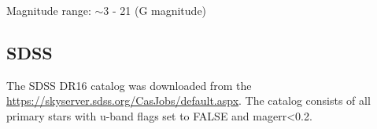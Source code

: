 Magnitude range: $\sim$3 - 21 (G magnitude)

\subsection{SDSS}
\label{sec:sdss}
The SDSS DR16 catalog was downloaded from the \href{SDSS SkyServer}{https://skyserver.sdss.org/CasJobs/default.aspx}.
The catalog consists of all primary stars with u-band flags set to FALSE and magerr<0.2.



